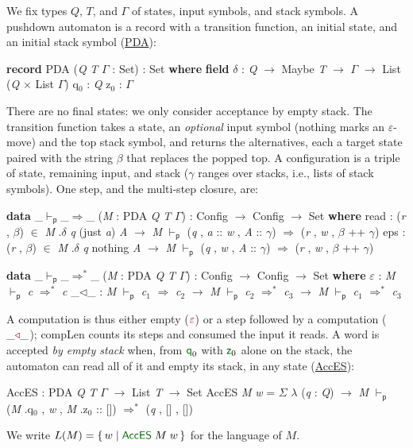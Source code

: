 \documentclass[runningheads]{llncs}
\newcommand{\blueFG}[1]{\textcolor[rgb]{0,0,0.8}{#1}}
\newcommand{\redFG}[1]{\textcolor[rgb]{0.6,0,0}{#1}}
\newcommand{\greenFG}[1]{\textcolor[rgb]{0,0.4,0}{#1}}
\newcommand{\purpleFG}[1]{\textcolor[rgb]{0.4,0,0.4}{#1}}
\newcommand{\D}[1]{{\blueFG{\textsf{#1}}}}      %
\newcommand{\Con}[1]{{\redFG{\textsf{#1}}}}     %
\newcommand{\F}[1]{{\greenFG{\textsf{#1}}}}     %
\newcommand{\V}[1]{{\purpleFG{\textit{#1}}}}    %
\newcommand{\Kw}[1]{\textbf{#1}}                %
\newcommand{\agdarev}{9ac99a00bb1dc0047eca6ac9ab8f15585acb3577}
\newcommand{\agdarepo}{https://github.com/lives-group/pda-pumping/blob/\agdarev/src}
\newcommand{\agdalink}[3]{\href{\agdarepo/#1\#L#2}{\F{#3}}}
\newcommand{\kto}{\ensuremath{\to}}
\newcommand{\kin}{\ensuremath{\in}}
\newcommand{\kpda}{\ensuremath{\vdash_{\mathsf{p}}}}
\newcommand{\kpRa}{\ensuremath{\Longrightarrow}}
\newcommand{\kpRas}{\ensuremath{\Longrightarrow^{*}}}
\newcommand{\ks}[1]{\ensuremath{_{#1}}}
\newcommand{\kla}{\ensuremath{\lambda}}
\newcommand{\kSigma}{\ensuremath{\Sigma}}
\newcommand{\kb}{\ensuremath{\beta}}
\newcommand{\kG}{\ensuremath{\Gamma}}   %
\newcommand{\kg}{\ensuremath{\gamma}}   %
\newcommand{\kd}{\ensuremath{\delta}}
\newcommand{\ktimes}{\ensuremath{\times}}
\begin{document}
We fix types $Q$, $T$, and $\kG$ of states, input symbols, and stack symbols. A
pushdown automaton is a record with a transition function, an initial state,
and an initial stack symbol (\agdalink{PDA/Base.agda}{21}{PDA}):
\begin{spec}
\Kw{record} \D{PDA} (\V{Q} \V{T} \V{\kG{}} : \D{Set}) : \D{Set} \Kw{where}
   \Kw{field}
      \F{\kd{}} : \V{Q} \kto{} \D{Maybe} \V{T} \kto{} \V{\kG{}} \kto{} \D{List} (\V{Q} \ktimes{} \D{List} \V{\kG{}})
      \F{q\ks{0}} : \V{Q}
      \F{z\ks{0}} : \V{\kG{}}
\end{spec}
There are no final states: we only consider acceptance by empty stack. The
transition function takes a state, an \emph{optional} input symbol
(\Con{nothing} marks an $\varepsilon$-move) and the top stack symbol, and
returns the alternatives, each a target state paired with the string $\beta$
that replaces the popped top. A configuration is a triple of state, remaining
input, and stack ($\kg$ ranges over stacks, i.e., lists of stack symbols). One
step, and the multi-step closure, are:
\begin{spec}
\Kw{data} \D{\_\kpda{}\_\kpRa{}\_} (\V{M} : \D{PDA} \V{Q} \V{T} \V{\kG{}}) : \D{Config} \kto{} \D{Config} \kto{} \D{Set} \Kw{where}
   \Con{read} : (\V{r} , \V{\kb{}}) \kin{} \V{M} \F{.\kd{}} \V{q} (\Con{just} \V{a}) \V{A} \kto{}
          \V{M} \kpda{} (\V{q} , \V{a} :: \V{w} , \V{A} :: \V{\kg{}}) \kpRa{} (\V{r} , \V{w} , \V{\kb{}} ++ \V{\kg{}})
   \Con{eps}  : (\V{r} , \V{\kb{}}) \kin{} \V{M} \F{.\kd{}} \V{q} \Con{nothing}  \V{A} \kto{}
          \V{M} \kpda{} (\V{q} , \V{w} , \V{A} :: \V{\kg{}}) \kpRa{} (\V{r} , \V{w} , \V{\kb{}} ++ \V{\kg{}})

\Kw{data} \D{\_\kpda{}\_\kpRas{}\_} (\V{M} : \D{PDA} \V{Q} \V{T} \V{\kG{}}) : \D{Config} \kto{} \D{Config} \kto{} \D{Set} \Kw{where}
   \Con{\ensuremath{\varepsilon}}   : \V{M} \kpda{} \V{c} \kpRas{} \V{c}
   \Con{\_\ensuremath{\triangleleft}\_} : \V{M} \kpda{} \V{c\ks{1}} \kpRa{} \V{c\ks{2}} \kto{} \V{M} \kpda{} \V{c\ks{2}} \kpRas{} \V{c\ks{3}} \kto{} \V{M} \kpda{} \V{c\ks{1}} \kpRas{} \V{c\ks{3}}
\end{spec}
A computation is thus either empty ($\Con{\ensuremath{\varepsilon}}$) or a step
followed by a computation ($\_\Con{\ensuremath{\triangleleft}}\_$); \F{compLen}
counts its steps and \F{consumed} the input it reads. A word is accepted
\emph{by empty stack} when, from $\F{q}_0$ with $\F{z}_0$ alone on the stack, the
automaton can read all of it and empty its stack, in any state
(\agdalink{PDA/Language.agda}{15}{AccES}):
\begin{spec}
\F{AccES} : \D{PDA} \V{Q} \V{T} \V{\kG{}} \kto{} \D{List} \V{T} \kto{} \D{Set}
\F{AccES} \V{M} \V{w}
   = \D{\kSigma{}} \kla{} (\V{q} : \V{Q}) \kto{} \V{M} \kpda{} (\V{M} \F{.q\ks{0}} , \V{w} , \V{M} \F{.z\ks{0}} :: []) \kpRas{} (\V{q} , [] , [])
\end{spec}
We write $L(M) = \{\,w \mid \F{AccES}\;M\;w\,\}$ for the language of $M$.
\end{document}
